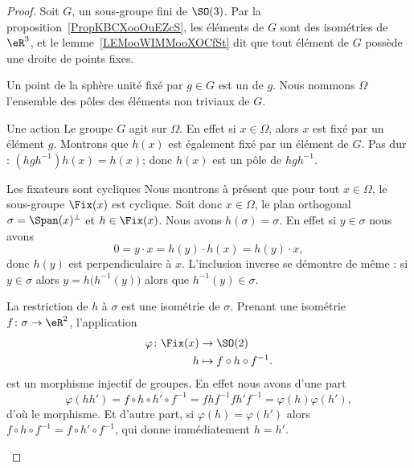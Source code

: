 \begin{proof}
	Soit \( G\), un sous-groupe fini de \( \SO(3)\). Par la proposition~\ref{PropKBCXooOuEZcS}, les éléments de \( G\) sont des isométries de \( \eR^3\), et le lemme~\ref{LEMooWIMMooXOCfSt} dit que tout élément de \( G\) possède une droite de points fixes.

	Un point de la sphère unité fixé par \( g\in G\) est un  de \( g\). Nous nommons \( \Omega\) l'ensemble des pôles des éléments non triviaux de \( G\).
	\begin{subproof}
		\item[Une action]
		Le groupe \( G\) agit sur \( \Omega\). En effet si \( x\in \Omega\), alors \( x\) est fixé par un élément \( g\). Montrons que \( h(x)\) est également fixé par un élément de \( G\). Pas dur : \( (hgh^{-1})h(x)=h(x)\); donc \( h(x)\) est un pôle de \( h gh^{-1}\).

		\item[Les fixateurs sont cycliques]
		Nous montrons à présent que pour tout \( x\in\Omega\), le sous-groupe \( \Fix(x)\) est cyclique. Soit donc \( x\in\Omega\), le plan orthogonal \( \sigma=\Span(x)^{\perp}\) et \( h\in \Fix(x)\). Nous avons \( h(\sigma)=\sigma\). En effet si \( y\in \sigma\) nous avons
		\begin{equation}
			0=y\cdot x=h(y)\cdot h(x)=h(y)\cdot x,
		\end{equation}
		donc \( h(y)\) est perpendiculaire à \( x\). L'inclusion inverse se démontre de même : si \( y\in \sigma\) alors \( y=h\big( h^{-1}(y) \big)\) alors que \( h^{-1}(y)\in \sigma\).

		La restriction de \( h\) à \( \sigma\) est une isométrie de \( \sigma\). Prenant une isométrie \( f\colon \sigma\to \eR^2\), l'application
		\begin{equation}
			\begin{aligned}
				\varphi\colon \Fix(x) & \to \SO(2)                    \\
				h                     & \mapsto f\circ h\circ f^{-1}.
			\end{aligned}
		\end{equation}
		est un morphisme injectif de groupes. En effet nous avons d'une part
		\begin{equation}
			\varphi(hh')=f\circ h\circ h'\circ f^{-1}=fhf^{-1}fh'f^{-1}=\varphi(h)\varphi(h'),
		\end{equation}
		d'où le morphisme. Et d'autre part, si \( \varphi(h)=\varphi(h')\) alors \( f\circ h\circ f^{-1}=f\circ h'\circ f^{-1}\), qui donne immédiatement \( h=h'\).


\end{subproof}
\end{proof}
